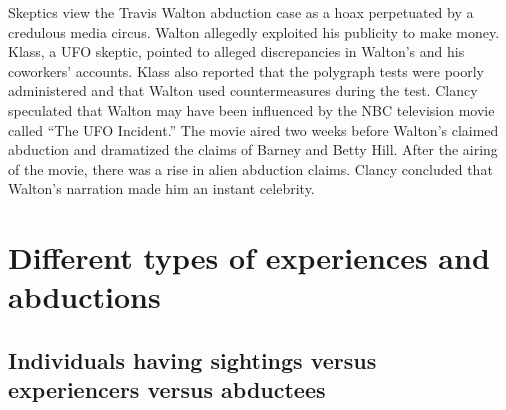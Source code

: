 Skeptics view the Travis Walton abduction case as a hoax perpetuated by a credulous media circus.
Walton allegedly exploited his publicity to make money.
Klass, a UFO skeptic, pointed to alleged discrepancies in Walton's and his coworkers' accounts.
Klass also reported that the polygraph tests were poorly administered and that Walton
used countermeasures during the test. Clancy speculated that Walton may have been influenced by the NBC television movie called
``The UFO Incident.'' The movie aired two weeks before Walton's claimed abduction and
dramatized the claims of Barney and Betty Hill. After the airing of the movie, there was a rise in alien abduction claims.
Clancy concluded that Walton's narration made him an instant celebrity.



\section{Different types of experiences and abductions}
\label{2023-UFO-part-Perception-abductions-dt}

\subsection{Individuals having sightings versus experiencers versus abductees}

